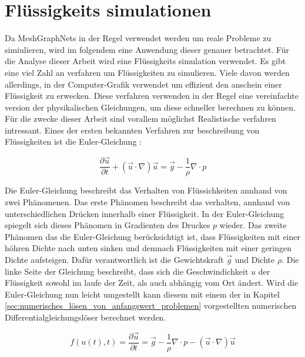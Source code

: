 
\section{Flüssigkeits simulationen} \label{sec:simulationen}

Da MeshGraphNets in der Regel verwendet werden um reale Probleme zu simiulieren, 
wird im folgendem eine Anwendung dieser genauer betrachtet.
Für die Analyse dieser Arbeit wird eine Flüssigkeits simulation verwendet.
Es gibt eine viel Zahl an verfahren um Flüssigkeiten zu simulieren.
Viele davon werden allerdings, in der Computer-Grafik verwendet um 
effizient den anschein einer Flüssigkeit zu erwecken.
Diese verfahren verwenden in der Regel eine vereinfachte version der physikalischen Gleichungen,
um diese schneller berechnen zu können.
Für die zwecke dieser Arbeit sind vorallem möglichst Realistische verfahren intressant.
Eines der ersten bekannten Verfahren zur beschreibung von Flüssigkeiten ist die Euler-Gleichung \cite[Kapitel~1]{navier_stokes}:

$$
\frac{\partial \vec{u}}{\partial t} + (\vec{u} \cdot \nabla) \vec{u} =  \vec{g} - \frac{1}{\rho} \nabla \cdot p
$$

Die Euler-Gleichung beschreibt das Verhalten von Flüssichkeiten annhand von zwei Phänomenen.
Das erste Phänomen beschreibt das verhalten, annhand von unterschiedlichen Drücken innerhalb einer Flüssigkeit.
In der Euler-Gleichung spiegelt sich dieses Phänomen in Gradienten des Druckes $p$ wieder.
Das zweite Phänomen das die Euler-Gleichung berücksichtigt ist, dass Flüssigkeiten mit
einer höhren Dichte nach unten sinken und demnach Flüssigkeiten mit einer geringen Dichte aufsteigen.
Dafür verantwortlich ist die Gewichtskraft $\vec{g}$ und Dichte $\rho$.
Die linke Seite der Gleichung beschreibt, dass sich die Geschwindichkeit $u$ der Flüssigkeit sowohl im laufe 
der Zeit, als auch abhängig vom Ort ändert.
Wird die Euler-Gleichung nun leicht umgestellt kann diesem mit einem der in Kapitel \ref{sec:numerisches_lösen_von_anfangswert_problemen} vorgestellten 
numerischen Differentialgleichungslöser berechnet werden.

$$
f(u(t), t) = \frac{\partial \vec{u}}{\partial t}  =  \vec{g} - \frac{1}{\rho} \nabla \cdot p -  (\vec{u} \cdot \nabla) \vec{u}
$$


